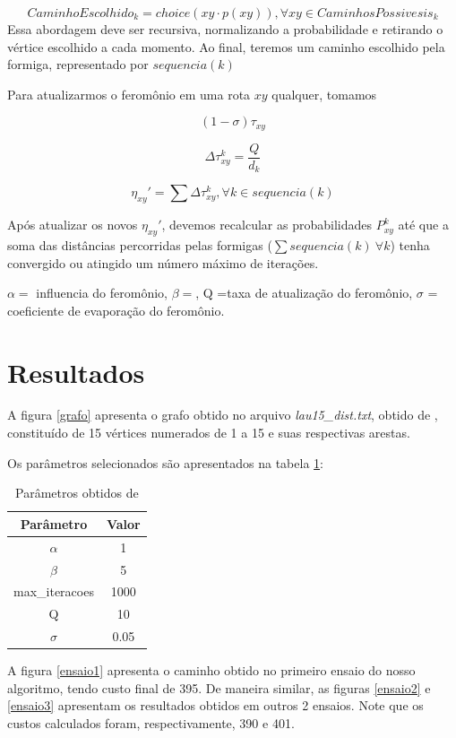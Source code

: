 \documentclass[12pt]{article}
\begin{document}
$$CaminhoEscolhido_{k} = choice(xy \cdot p(xy)), \forall xy \in  CaminhosPossivesis_{k}$$
Essa abordagem deve ser recursiva, normalizando a probabilidade e retirando o vértice escolhido a cada momento. 
Ao final, teremos um caminho escolhido pela formiga, representado por $sequencia(k)$


Para atualizarmos o feromônio em uma rota $xy$ qualquer, tomamos 

$$(1-\sigma)\tau_{xy} $$

$$\Delta \tau_{xy}^k = \frac{Q}{d_k}$$

$$\eta_{xy}' = \sum  \Delta \tau_{xy}^k, \forall k \in sequencia(k) $$

Após atualizar os novos $\eta_{xy}'$, devemos recalcular as probabilidades $P_{xy}^k$ até que a soma das distâncias percorridas pelas formigas ($\sum sequencia(k) \ \forall k$) tenha convergido ou atingido um número máximo de iterações.

$\alpha=$ influencia do feromônio, $\beta =$, Q =taxa de atualização do feromônio, $\sigma$ = coeficiente de evaporação do feromônio.

\section{Resultados}
A figura \ref{grafo} apresenta o grafo obtido no arquivo \textit{lau15\_dist.txt}, obtido de \cite{citiesdataset}, constituído de 15 vértices numerados de 1 a 15 e suas respectivas arestas.

Os parâmetros selecionados são apresentados na tabela \ref{parametros}:

\begin{table}[]
    \centering
    \begin{tabular}{cc}
         Parâmetro & Valor  \\
         \hline 
         $\alpha$ & 1\\
         $\beta$ & 5\\
         max\_iteracoes & 1000\\
         Q & 10 \\
         $\sigma$ & 0.05\\
         \hline
    \end{tabular}
    \caption{Parâmetros obtidos de \cite{antcolonytspvideo}}
    \label{parametros}
\end{table}

A figura \ref{ensaio1} apresenta o caminho obtido no primeiro ensaio do nosso algoritmo, tendo custo final de 395. De maneira similar, as figuras \ref{ensaio2} e \ref{ensaio3}  apresentam os resultados obtidos em outros 2 ensaios. Note que os custos calculados foram, respectivamente, 390 e 401. 
\end{document}
